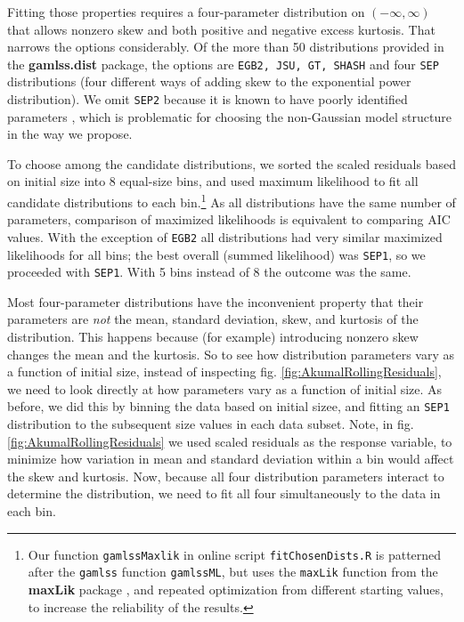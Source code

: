 \documentclass[11pt]{article}
\begin{document}
{Fitting those properties requires a four-parameter distribution on $(-\infty, \infty)$ that allows nonzero skew and both 
positive and negative excess kurtosis. That narrows the options considerably. 
Of the more than 50 distributions provided in the \textbf{gamlss.dist} package, the options are 
\texttt{EGB2, JSU, GT, SHASH} and four \texttt{SEP} distributions (four different ways of adding skew to the
exponential power distribution). We omit \texttt{SEP2} because it is known to have poorly identified parameters
\citep{diciccio-monti-2004}, which is problematic for choosing the non-Gaussian model structure in the way we propose.   

To choose among the candidate distributions, we sorted the scaled residuals based on initial size into 8 equal-size bins, 
and used maximum likelihood to fit all candidate distributions to each bin.\footnote{Our function \texttt{gamlssMaxlik} 
in online script \texttt{fitChosenDists.R} is
patterned after the \texttt{gamlss} function \texttt{gamlssML}, but uses the \texttt{maxLik} function from the \textbf{maxLik}
package \citep{maxLik-package}, and repeated optimization from different starting values, to increase the reliability of the results.} 
As all distributions have the same number of parameters, comparison of maximized likelihoods is equivalent to comparing AIC values. 
With the exception of \texttt{EGB2} all distributions had very similar maximized likelihoods for all bins; the best overall (summed
likelihood) was \texttt{SEP1}, so we proceeded with \texttt{SEP1}. With 5 bins instead of 8 the outcome was the same. 

Most four-parameter distributions have the inconvenient property that their parameters are \emph{not} the mean, standard deviation, skew,
and kurtosis of the distribution. This happens because (for example) introducing nonzero skew changes the mean and the kurtosis. 
So to see how distribution parameters vary as a function of initial size, instead of inspecting fig. \ref{fig:AkumalRollingResiduals}, we need
to look directly at how parameters vary as a function of initial size. As before, we did this by binning the data based on initial sizee, 
and fitting an \texttt{SEP1} distribution to the subsequent size values in each data subset. Note, 
in fig. \ref{fig:AkumalRollingResiduals} we used scaled residuals as the response variable, 
to minimize how variation in mean and standard deviation within a bin would affect the skew and kurtosis. 
Now, because all four distribution parameters interact to determine the distribution, we need to fit all 
four simultaneously to the data in each bin. 

}
\end{document}

